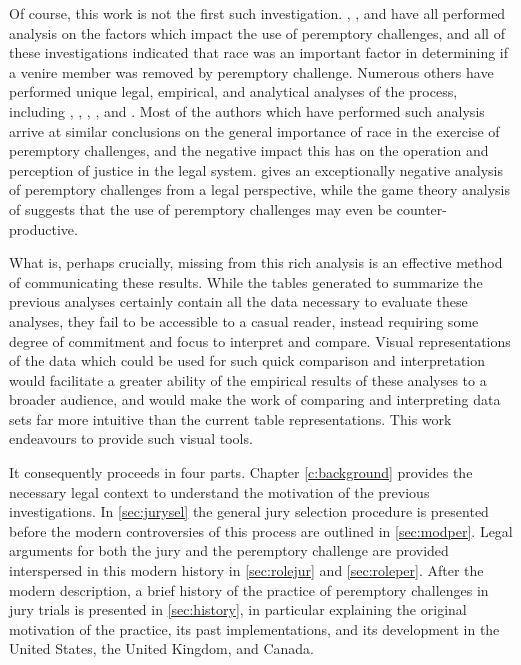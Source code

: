 Of course, this work is not the first such investigation. \cite{JurySunshineProj}, \cite{StubbornLegacy}, and
\cite{PerempChalMurder} have all performed analysis on the factors which impact the use of peremptory challenges, and all of these
investigations indicated that race was an important factor in determining if a venire member was removed by peremptory
challenge. Numerous others have performed unique legal, empirical, and analytical analyses of the process, including
\cite{hoffman1997}, \cite{vandykejurysel}, \cite{hansvidjudging}, \cite{brown1978}, and \cite{ford2010}. Most of the authors which have
performed such analysis arrive at similar conclusions on the general importance of race in the exercise of peremptory challenges,
and the negative impact this has on the operation and perception of justice in the legal system. \cite{hoffman1997} gives an
exceptionally negative analysis of peremptory challenges from a legal perspective, while the game theory analysis of
\cite{ford2010} suggests that the use of peremptory challenges may even be counter-productive.

What is, perhaps crucially, missing from this rich analysis is an effective method of communicating these results. While the
tables generated to summarize the previous analyses certainly contain all the data necessary to evaluate these analyses, they fail
to be accessible to a casual reader, instead requiring some degree of commitment and focus to interpret and compare. Visual
representations of the data which could be used for such quick comparison and interpretation would facilitate a greater ability of
the empirical results of these analyses to a broader audience, and would make the work of comparing and interpreting data sets far
more intuitive than the current table representations. This work endeavours to provide such visual tools.

It consequently proceeds in four parts. Chapter \ref{c:background} provides the necessary legal context to understand the
motivation of the previous investigations. In \ref{sec:jurysel} the general jury selection procedure is presented before the
modern controversies of this process are outlined in \ref{sec:modper}. Legal arguments for both the jury and the peremptory
challenge are provided interspersed in this modern history in \ref{sec:rolejur} and \ref{sec:roleper}. After the modern
description, a brief history of the practice of peremptory challenges in jury trials is presented in \ref{sec:history}, in
particular explaining the original motivation of the practice, its past implementations, and its development in the United States,
the United Kingdom, and Canada.

